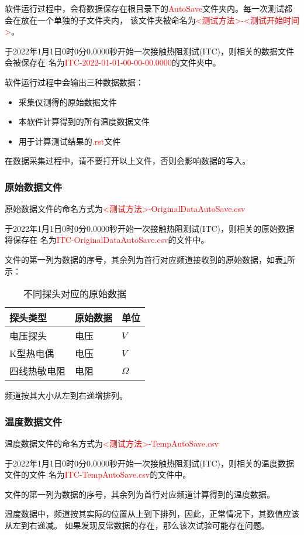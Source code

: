 软件运行过程中，会将数据保存在根目录下的\textcolor{red}{AutoSave}文件夹内。每一次测试都会在放在一个单独的子文件夹内，
该文件夹被命名为\textcolor{red}{<测试方法>-<测试开始时间>}。
\begin{example}
    于2022年1月1日0时0分0.0000秒开始一次接触热阻测试(ITC)，则相关的数据文件会被保存在
    名为\textcolor{red}{ITC-2022-01-01-00-00-00.0000}的文件夹中。
\end{example}
软件运行过程中会输出三种数据数据：
\begin{itemize}
    \item 采集仪测得的原始数据文件
    \item 本软件计算得到的所有温度数据文件
    \item 用于计算测试结果的\textcolor{red}{.rst}文件
\end{itemize}
\begin{note}
    在数据采集过程中，请不要打开以上文件，否则会影响数据的写入。
\end{note}
\subsubsection*{原始数据文件}
原始数据文件的命名方式为\textcolor{red}{<测试方法>-OriginalDataAutoSave.csv}
\begin{example}
    于2022年1月1日0时0分0.0000秒开始一次接触热阻测试(ITC)，则相关的原始数据将保存在
    名为\textcolor{red}{ITC-OriginalDataAutoSave.csv}的文件中。
\end{example}
文件的第一列为数据的序号，其余列为首行对应频道接收到的原始数据，如表\ref{tab:originalData}所示：
\begin{table}[htbp]
    \centering
    \caption{ 不同探头对应的原始数据 \label{tab:originalData}}
    \begin{tabular}{@{}lll@{}}
        \toprule
        探头类型     & 原始数据 & 单位     \\ \midrule
        电压探头     & 电压     & $V $     \\
        K型热电偶    & 电压     & $V$      \\
        四线热敏电阻 & 电阻     & $\varOmega$ \\ \bottomrule
    \end{tabular}
\end{table}
频道按其大小从左到右递增排列。

\subsubsection*{温度数据文件}
温度数据文件的命名方式为\textcolor{red}{<测试方法>-TempAutoSave.csv}
\begin{example}
    于2022年1月1日0时0分0.0000秒开始一次接触热阻测试(ITC)，则相关的温度数据文件的文件
    名为\textcolor{red}{ITC-TempAutoSave.csv}的文件中。
\end{example}
文件的第一列为数据的序号，其余列为首行对应频道计算得到的温度数据。
\begin{note}
    温度数据中，频道按其实际的位置从上到下排列，因此，正常情况下，其数值应该从左到右递减。
    如果发现反常数据的存在，那么该次试验可能存在问题。
\end{note}

